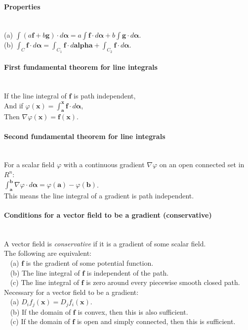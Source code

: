 \documentclass[10pt]{article}
\newcommand{\bs}[1]{\pmb{#1}}
\begin{document}
\paragraph{Properties}\ \\
(a) $\int (a\bs{f} + b\bs{g}) \cdot d\bs{\alpha} = a \int \bs{f} \cdot d\bs{\alpha}+b\int \bs{g}\cdot d\bs{\alpha}$.\\
(b) $\int_C \bs{f} \cdot d\bs{\alpha} = \int_{C_1}\bs{f}\cdot d\bs{alpha}+\int_{C_2}\bs{f}\cdot d\bs{\alpha}$.

\paragraph{First fundamental theorem for line integrals}\ \\
If the line integral of $\bs{f}$ is path independent,\\
And if $\varphi(\bs{x}) = \int_{\bs{a}}^{\bs{x}} \bs{f}\cdot d\bs{\alpha}$,\\
Then $\nabla\varphi(\bs{x}) = \bs{f}(\bs{x})$.

\paragraph{Second fundamental theorem for line integrals}\ \\
For a scalar field $\varphi$ with a continuous gradient $\nabla \varphi$ on an open connected set in $R^n$:\\
$\int_{\bs{a}}^{\bs{b}} \nabla\varphi\cdot d\bs{\alpha} = \varphi(\bs{a}) - \varphi(\bs{b})$.\\
This means the line integral of a gradient is path independent.

\paragraph{Conditions for a vector field to be a gradient (conservative)}\ \\
A vector field is {\it conservative} if it is a gradient of some scalar field.\\
The following are equivalent:\\
$\phantom{x}$ (a) $\bs{f}$ is the gradient of some potential function.\\
$\phantom{x}$ (b) The line integral of $\bs{f}$ is independent of the path.\\
$\phantom{x}$ (c) The line integral of $\bs{f}$ is zero around every piecewise smooth closed path.\\
Necessary for a vector field to be a gradient:\\
$\phantom{x}$ (a) $D_if_j(\bs{x}) = D_jf_i(\bs{x})$.\\
$\phantom{x}$ (b) If the domain of $\bs{f}$ is convex, then this is also sufficient.\\
$\phantom{x}$ (c) If the domain of $\bs{f}$ is open and simply connected, then this is sufficient.
\end{document}
